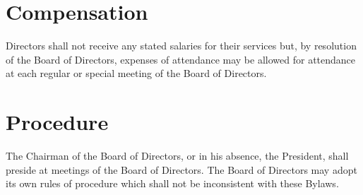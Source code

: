 \section{Compensation}

Directors shall not receive any stated salaries for their services but, by
resolution of the Board of Directors, expenses of attendance may be allowed for
attendance at each regular or special meeting of the Board of Directors.

\section{Procedure}

The Chairman of the Board of Directors, or in his absence, the President, shall
preside at meetings of the Board of Directors. The Board of Directors may adopt
its own rules of procedure which shall not be inconsistent with these Bylaws.

